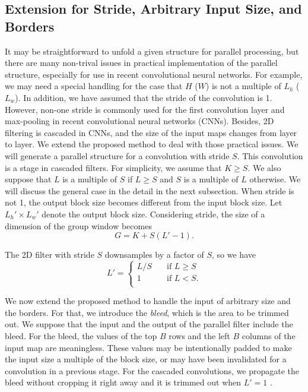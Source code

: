 \documentclass[journal]{IEEEtran}
\begin{document}
\subsection{Extension for Stride, Arbitrary Input Size, and Borders}
It may be straightforward to unfold a given structure for parallel processing, but there are many non-trival issues in practical implementation of the parallel structure, especially for use in recent convolutional neural networks. For example, we may need a special handling for the case that $H$ ($W$) is not a multiple of $L_h$ ($L_w$).  In addition, we have assumed that the stride of the convolution is 1. 
However, non-one stride is commonly used for the first convolution layer and max-pooling in recent convolutional neural networks (CNNs). 
Besides, 2D filtering is cascaded in CNNs, and the size of the input maps changes from layer to layer.  
We extend the proposed method to deal with those practical issues. We will generate a parallel structure for a convolution with stride $S$. This convolution is a stage in cascaded filters.  For simplicity, we assume that $K \ge S$. We also suppose that $L$ is a multiple of $S$ if $L\ge S$ and $S$ is a multiple of $L$ otherwise. We will discuss the general case in the detail in the next subsection. When stride is not 1, the output block size becomes different from the input block size. Let $L_h' \times L_w'$ denote the output block size.
Considering stride, the size of a dimension of the group window becomes
\begin{equation}
	G = K + S(L'-1). 
\end{equation}
 
The 2D filter with stride $S$ downsamples by a factor of $S$, so we have   
\begin{equation}
L' = 
  \begin{cases}
    L/S       & \quad \text{if } L\ge S \\
    1         & \quad \text{if } L<S.\\
  \end{cases}
\end{equation}

We now extend the proposed method to handle the input of arbitrary size and the borders. For that, we introduce the \textit{bleed}, which is the area to be trimmed out.
We suppose that the input and the output of the parallel filter include the bleed. For the bleed, the values of the top $B$ rows and the left $B$ columns of the input map are meaningless. 
These values may be intentionally padded to make the input size a multiple of the block size, or may have been invalidated for a convolution in a previous stage. For the cascaded convolutions, we propagate the bleed without cropping it right away and it is trimmed out when $L'=1$ .
\end{document}
